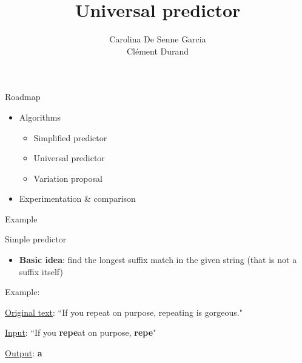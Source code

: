 \documentclass[aspectratio=169]{beamer}
\title[Pattern-based prediction algorithms, applications and variations]
      {Universal predictor}
\author{%
  Carolina De Senne Garcia\\%
  Clément Durand%
}
\begin{document}
\maketitle

\begin{frame}{Roadmap}\Large
  \begin{itemize}
    \item Algorithms
      \begin{itemize}
        \item Simplified predictor
        \item Universal predictor
        \item Variation proposal
      \end{itemize}
    \item Experimentation \& comparison
  \end{itemize}
\end{frame}


\begin{frame}{Example}\centering
  
\end{frame}

  \begin{frame}{Simple predictor}
    \begin{itemize}
      \item \textbf{Basic idea}: find the longest suffix match in the given string (that is not a suffix itself)
    \end{itemize}

    \vspace{\fill}

    Example:

  \underline{Original text}: ``If you repeat on purpose, repeating is gorgeous."

    \vspace{\fill}

    \underline{Input}: ``If you \textbf{repe}at on purpose, \textbf{repe}"

    \underline{Output}: \textbf{a} 
  \end{frame}
\end{document}
